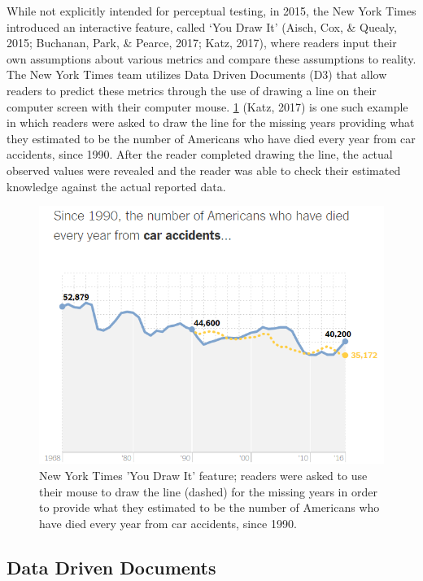 \documentclass[print]{nuthesis}
\begin{document}
While not explicitly intended for perceptual testing, in 2015, the New York Times introduced an interactive feature, called `You Draw It' (Aisch, Cox, \& Quealy, 2015; Buchanan, Park, \& Pearce, 2017; Katz, 2017), where readers input their own assumptions about various metrics and compare these assumptions to reality.
The New York Times team utilizes Data Driven Documents (D3) that allow readers to predict these metrics through the use of drawing a line on their computer screen with their computer mouse.
\cref{fig:nyt-caraccidents} (Katz, 2017) is one such example in which readers were asked to draw the line for the missing years providing what they estimated to be the number of Americans who have died every year from car accidents, since 1990.
After the reader completed drawing the line, the actual observed values were revealed and the reader was able to check their estimated knowledge against the actual reported data.

\begin{figure}[tbp]

{\centering \includegraphics[width=0.75\linewidth,]{images/02-you-draw-it/nyt-caraccidents-frame4} 

}

\caption[New York Times 'You Draw It' feature]{New York Times 'You Draw It' feature; readers were asked to use their mouse to draw the line (dashed) for the missing years in order to provide what they estimated to be the number of Americans who have died every year from car accidents, since 1990.}\label{fig:nyt-caraccidents}
\end{figure}

\hypertarget{data-driven-documents}{%
\subsection{Data Driven Documents}\label{data-driven-documents}}
\end{document}
